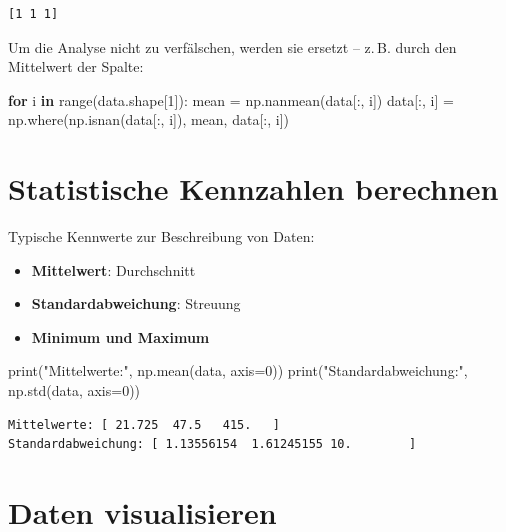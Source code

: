 \documentclass[
  letterpaper,
  DIV=11,
  numbers=noendperiod]{scrreprt}
\newenvironment{Shaded}{\begin{snugshade}}{\end{snugshade}}
\newcommand{\BuiltInTok}[1]{\textcolor[rgb]{0.00,0.23,0.31}{#1}}
\newcommand{\ControlFlowTok}[1]{\textcolor[rgb]{0.00,0.23,0.31}{\textbf{#1}}}
\newcommand{\DecValTok}[1]{\textcolor[rgb]{0.68,0.00,0.00}{#1}}
\newcommand{\KeywordTok}[1]{\textcolor[rgb]{0.00,0.23,0.31}{\textbf{#1}}}
\newcommand{\NormalTok}[1]{\textcolor[rgb]{0.00,0.23,0.31}{#1}}
\newcommand{\OperatorTok}[1]{\textcolor[rgb]{0.37,0.37,0.37}{#1}}
\newcommand{\StringTok}[1]{\textcolor[rgb]{0.13,0.47,0.30}{#1}}
\providecommand{\tightlist}{%
  \setlength{\itemsep}{0pt}\setlength{\parskip}{0pt}}\usepackage{longtable,booktabs,array}
\begin{document}
\begin{verbatim}
[1 1 1]
\end{verbatim}

Um die Analyse nicht zu verfälschen, werden sie ersetzt -- z.\,B. durch
den Mittelwert der Spalte:

\begin{Shaded}
\begin{Highlighting}[]
\ControlFlowTok{for}\NormalTok{ i }\KeywordTok{in} \BuiltInTok{range}\NormalTok{(data.shape[}\DecValTok{1}\NormalTok{]):}
\NormalTok{    mean }\OperatorTok{=}\NormalTok{ np.nanmean(data[:, i])}
\NormalTok{    data[:, i] }\OperatorTok{=}\NormalTok{ np.where(np.isnan(data[:, i]), mean, data[:, i])}
\end{Highlighting}
\end{Shaded}

\section{Statistische Kennzahlen
berechnen}\label{statistische-kennzahlen-berechnen}

Typische Kennwerte zur Beschreibung von Daten:

\begin{itemize}
\tightlist
\item
  \textbf{Mittelwert}: Durchschnitt
\item
  \textbf{Standardabweichung}: Streuung
\item
  \textbf{Minimum und Maximum}
\end{itemize}

\begin{Shaded}
\begin{Highlighting}[]
\BuiltInTok{print}\NormalTok{(}\StringTok{"Mittelwerte:"}\NormalTok{, np.mean(data, axis}\OperatorTok{=}\DecValTok{0}\NormalTok{))}
\BuiltInTok{print}\NormalTok{(}\StringTok{"Standardabweichung:"}\NormalTok{, np.std(data, axis}\OperatorTok{=}\DecValTok{0}\NormalTok{))}
\end{Highlighting}
\end{Shaded}

\begin{verbatim}
Mittelwerte: [ 21.725  47.5   415.   ]
Standardabweichung: [ 1.13556154  1.61245155 10.        ]
\end{verbatim}

\section{Daten visualisieren}\label{daten-visualisieren}
\end{document}
